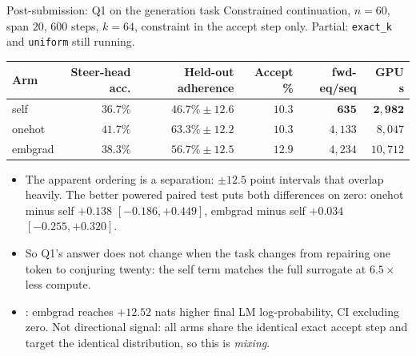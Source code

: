 \documentclass{beamer}
\begin{document}
\begin{frame}[noframenumbering]{Post-submission: Q1 on the generation task}
  \small
  Constrained continuation, $n=60$, span $20$, $600$ steps, $k=64$, constraint in the accept
  step only. Partial: \texttt{exact\_k} and \texttt{uniform} still running.
  \begin{center}
  \scriptsize
  \begin{tabular}{lrrrrr}
    \toprule
    Arm & Steer-head acc. & Held-out adherence & Accept \% & fwd-eq/seq & GPU s \\
    \midrule
    self    & $36.7\%$ & $46.7\% \pm 12.6$ & $10.3$ & $\bm{635}$ & $\bm{2{,}982}$ \\
    onehot  & $41.7\%$ & $63.3\% \pm 12.2$ & $10.3$ & $4{,}133$ & $8{,}047$ \\
    embgrad & $38.3\%$ & $56.7\% \pm 12.5$ & $12.9$ & $4{,}234$ & $10{,}712$ \\
    \bottomrule
  \end{tabular}
  \end{center}
  \vspace{0.3em}
  \begin{itemize}\small
    \item The apparent ordering is  a separation: $\pm 12.5$ point intervals that
      overlap heavily. The better powered paired test puts both differences on zero: onehot minus
      self $+0.138$ $[-0.186,+0.449]$, embgrad minus self $+0.034$ $[-0.255,+0.320]$.
    \item So Q1's answer does not change when the task changes from repairing one token to
      conjuring twenty: the self term matches the full surrogate at $6.5\times$ less compute.
    \item {}: embgrad reaches $+12.52$ nats higher final LM
      log-probability, CI excluding zero. Not directional signal: all arms share the identical
      exact accept step and target the identical distribution, so this is \emph{mixing}.
  \end{itemize}
\end{frame}
\end{document}
